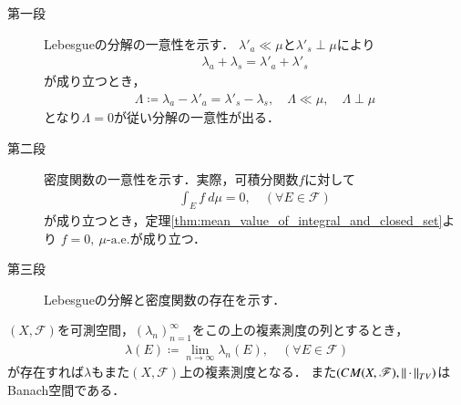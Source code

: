 	\begin{prf}\mbox{}
		\begin{description}
			\item[第一段] Lebesgueの分解の一意性を示す．
				$\lambda'_a \ll \mu$と$\lambda'_s \perp \mu$により
				\begin{align}
					\lambda_a + \lambda_s = \lambda'_a + \lambda'_s
				\end{align}
				が成り立つとき，
				\begin{align}
					\Lambda \coloneqq \lambda_a - \lambda'_a = \lambda'_s - \lambda_s,
					\quad \Lambda \ll \mu,
					\quad \Lambda \perp \mu
				\end{align}
				となり$\Lambda = 0$が従い分解の一意性が出る．
			
			\item[第二段] 密度関数の一意性を示す．実際，可積分関数$f$に対して
				\begin{align}
					\int_E f\ d\mu = 0, \quad (\forall E \in \mathscr{F})
				\end{align}
				が成り立つとき，定理\ref{thm:mean_value_of_integral_and_closed_set}より
				$f = 0,\ \mbox{$\mu$-a.e.}$が成り立つ．
				
			\item[第三段] Lebesgueの分解と密度関数の存在を示す．
				
		\end{description}
	\end{prf}
	
	\begin{screen}
		\begin{thm}\label{thm;Vitali_Hahn_Saks}
			$(X,\mathscr{F})$を可測空間，$(\lambda_n)_{n=1}^\infty$をこの上の複素測度の列とするとき，
			\begin{align}
				\lambda(E) \coloneqq \lim_{n \to \infty} \lambda_n(E),
				\quad (\forall E \in \mathscr{F})
				\label{eq:thm_Vitali_Hahn_Saks}
			\end{align}
			が存在すれば$\lambda$もまた$(X,\mathscr{F})$上の複素測度となる．
			また$(CM(X,\mathscr{F}),\left\|\, \cdot\, \right\|_{TV})$はBanach空間である．
		\end{thm}
	\end{screen}
	
